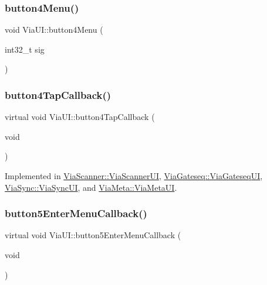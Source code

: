 \mbox{\label{class_via_u_i_a4d97fe8dca5340f69e5b4441928e4364}} 
\subsubsection{\texorpdfstring{button4\+Menu()}{button4Menu()}}
{\footnotesize\ttfamily void Via\+U\+I\+::button4\+Menu (\begin{DoxyParamCaption}\item[{int32\+\_\+t}]{sig }\end{DoxyParamCaption})}

\mbox{\label{class_via_u_i_a4925f089aa720ca88d84246f434112e9}} 
\subsubsection{\texorpdfstring{button4\+Tap\+Callback()}{button4TapCallback()}}
{\footnotesize\ttfamily virtual void Via\+U\+I\+::button4\+Tap\+Callback (\begin{DoxyParamCaption}\item[{void}]{ }\end{DoxyParamCaption})\hspace{0.3cm}{\ttfamily [pure virtual]}}



Implemented in \mbox{\hyperlink{class_via_scanner_1_1_via_scanner_u_i_a31a0153f6ca3260241e7c7373723bfb8}{Via\+Scanner\+::\+Via\+Scanner\+UI}}, \mbox{\hyperlink{class_via_gateseq_1_1_via_gateseq_u_i_a329721a8753f915ba96248fab6da7b60}{Via\+Gateseq\+::\+Via\+Gateseq\+UI}}, \mbox{\hyperlink{class_via_sync_1_1_via_sync_u_i_a00ba5badfeedc792a05f3e3c0ac19d73}{Via\+Sync\+::\+Via\+Sync\+UI}}, and \mbox{\hyperlink{class_via_meta_1_1_via_meta_u_i_a0c745451e4e0b8bc51546280595b5b28}{Via\+Meta\+::\+Via\+Meta\+UI}}.

\mbox{\label{class_via_u_i_adb40844fb1fa8e623f3a7eaecdbfad53}} 
\subsubsection{\texorpdfstring{button5\+Enter\+Menu\+Callback()}{button5EnterMenuCallback()}}
{\footnotesize\ttfamily virtual void Via\+U\+I\+::button5\+Enter\+Menu\+Callback (\begin{DoxyParamCaption}\item[{void}]{ }\end{DoxyParamCaption})\hspace{0.3cm}{\ttfamily [pure virtual]}}



